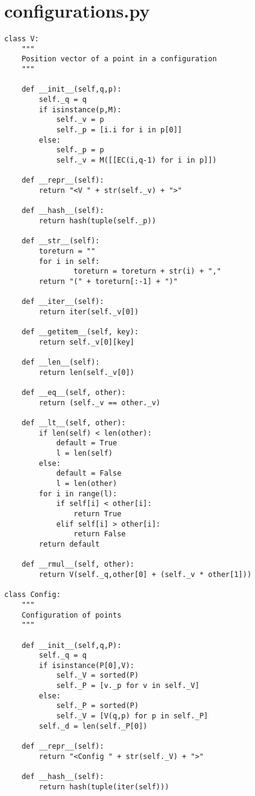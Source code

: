 \documentclass[12pt]{amsart}
\theoremstyle{plain}
\begin{document}
\section{configurations.py}
\begin{verbatim}
class V:
    """
    Position vector of a point in a configuration
    """

    def __init__(self,q,p):
        self._q = q
        if isinstance(p,M):
            self._v = p
            self._p = [i.i for i in p[0]]
        else:
            self._p = p
            self._v = M([[EC(i,q-1) for i in p]])

    def __repr__(self):
        return "<V " + str(self._v) + ">"

    def __hash__(self):
        return hash(tuple(self._p))

    def __str__(self):
        toreturn = ""
        for i in self:
                toreturn = toreturn + str(i) + ","
        return "(" + toreturn[:-1] + ")"

    def __iter__(self):
        return iter(self._v[0])

    def __getitem__(self, key):
        return self._v[0][key]

    def __len__(self):
        return len(self._v[0])

    def __eq__(self, other):
        return (self._v == other._v)

    def __lt__(self, other):
        if len(self) < len(other):
            default = True
            l = len(self)
        else:
            default = False
            l = len(other)
        for i in range(l):
            if self[i] < other[i]:
                return True
            elif self[i] > other[i]:
                return False
        return default

    def __rmul__(self, other):
        return V(self._q,other[0] + (self._v * other[1]))

class Config:
    """
    Configuration of points
    """

    def __init__(self,q,P):
        self._q = q
        if isinstance(P[0],V):
            self._V = sorted(P)
            self._P = [v._p for v in self._V]
        else:
            self._P = sorted(P)
            self._V = [V(q,p) for p in self._P]
        self._d = len(self._P[0])

    def __repr__(self):
        return "<Config " + str(self._V) + ">"

    def __hash__(self):
        return hash(tuple(iter(self)))


\end{verbatim}
\end{document}
